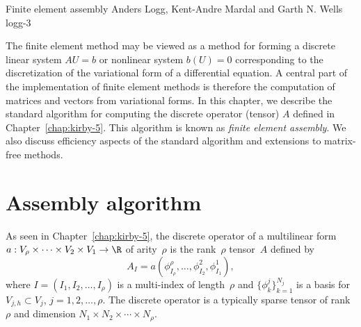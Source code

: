               {Finite element assembly}
              {Anders Logg, Kent-Andre Mardal and Garth N. Wells}
              {logg-3}

The finite element method may be viewed as a method for forming a
discrete linear system $AU = b$ or nonlinear system $b(U) = 0$
corresponding to the discretization of the variational form of a
differential equation. A central part of the implementation of finite
element methods is therefore the computation of matrices and vectors
from variational forms. In this chapter, we describe the standard
algorithm for computing the discrete operator (tensor) $A$ defined in
Chapter~\ref{chap:kirby-5}. This algorithm is known as \emph{finite
element assembly}. We also discuss efficiency aspects of the
standard algorithm and extensions to matrix-free methods.

\section{Assembly algorithm}

As seen in Chapter~\ref{chap:kirby-5}, the discrete operator of a
multilinear form~$a : V_{\rho} \times \cdots \times V_2 \times V_1
\rightarrow \R$ of arity~$\rho$ is the rank~$\rho$ tensor~$A$ defined
by
\begin{equation}
  A_I = a(\phi^{\rho}_{I_{\rho}}, \ldots, \phi^2_{I_2}, \phi^1_{I_1}),
\end{equation}
where $I = (I_1, I_2, \ldots, I_{\rho})$ is a multi-index of
length~$\rho$ and $\{\phi^j_k\}_{k=1}^{N_j}$ is a basis for $V_{j,h}
\subset V_j$, $j = 1,2,\ldots,\rho$. The discrete operator is a
typically sparse tensor of rank~$\rho$ and dimension $N_1 \times N_2
\times \cdots \times N_{\rho}$.

